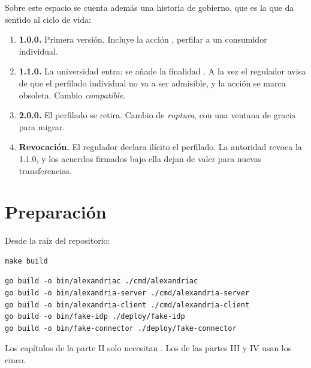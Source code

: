 \medskip
Sobre este espacio se cuenta además una historia de gobierno, que es la que da sentido al ciclo de vida:

\begin{enumerate}[leftmargin=*, itemsep=2pt]
  \item \textbf{1.0.0.} Primera versión. Incluye la acción , perfilar a un consumidor individual.
  \item \textbf{1.1.0.} La universidad entra: se añade la finalidad . A la vez el regulador avisa de
        que el perfilado individual no va a ser admisible, y la acción se marca obsoleta. Cambio \emph{compatible}.
  \item \textbf{2.0.0.} El perfilado se retira. Cambio de \emph{ruptura}, con una ventana de gracia para migrar.
  \item \textbf{Revocación.} El regulador declara ilícito el perfilado. La autoridad revoca la 1.1.0, y los acuerdos
        firmados bajo ella dejan de valer para nuevas transferencias.
\end{enumerate}

\section{Preparación}

Desde la raíz del repositorio:

\begin{lstlisting}[style=sh]
make build
\end{lstlisting}
\begin{lstlisting}[style=out]
go build -o bin/alexandriac ./cmd/alexandriac
go build -o bin/alexandria-server ./cmd/alexandria-server
go build -o bin/alexandria-client ./cmd/alexandria-client
go build -o bin/fake-idp ./deploy/fake-idp
go build -o bin/fake-connector ./deploy/fake-connector
\end{lstlisting}

Los capítulos de la parte II solo necesitan . Los de las partes III y IV usan los cinco.

